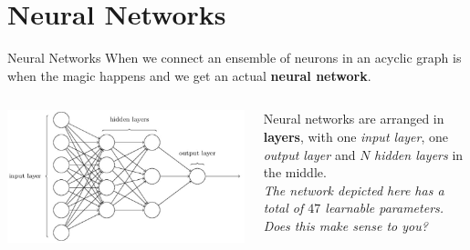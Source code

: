 \documentclass[aspectratio=169]{beamer}
\begin{document}


\section{Neural Networks}

\begin{frame}{Neural Networks}
When we connect an ensemble of neurons in an acyclic graph is when the magic happens and we get an actual \textbf{neural network}.
\vspace{0.5cm}
\begin{columns}
\begin{column}{0.48\textwidth}
\centering
\includegraphics[width=1.0\textwidth]{img/dnn/neural_network.jpg}    \end{column}
\begin{column}{0.48\textwidth}
Neural networks are arranged in \textbf{layers}, with one \textit{input layer}, one \textit{output layer} and $N$ \textit{hidden layers} in the middle.\\
\vspace{0.5cm}
\textit{\small{The network depicted here has a total of $47$ learnable parameters. Does this make sense to you?}}
\end{column}
\end{columns}
\end{frame}
\end{document}
